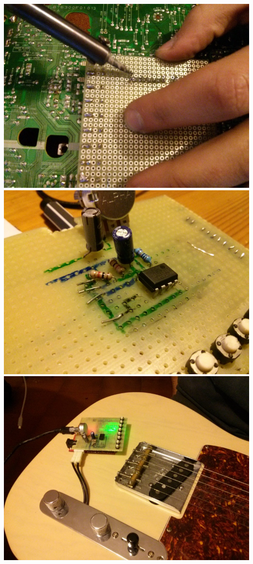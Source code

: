 \documentclass[a4paper,11pt]{article}
\begin{document}
\includegraphics[width=\textwidth]{foto_4.jpg}
\includegraphics[width=\textwidth]{foto_5.jpg}
\includegraphics[width=\textwidth]{foto_6.jpg}
\end{document}

